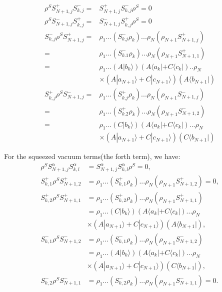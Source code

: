 \documentclass[aps,showpacs,twocolumn,twoside,groupedaddress]{revtex4}
\begin{document}
\begin{equation}
\label{eq8}
\begin{split}
\rho^{S}S_{N+1,j}^{+}S_{k,j}^{-}=&S_{N+1,j}^{+}S_{k,j}^{-}\rho^{S}=0\\
\rho^{S}S_{N+1,j}^{-}S_{k,j}^{+}=&S_{N+1,j}^{-}S_{k,j}^{+}\rho^{S}=0\\
S_{k,j}^{-}\rho^{S}S_{N+1,j}^{+}=&\rho_{1}...(S_{k.j}^{-}\rho_{k})...\rho_{N}(\rho_{N+1}S_{N+1,j}^{+})\\
=&\rho_{1}...(S_{k.1}^{-}\rho_{k})...\rho_{N}(\rho_{N+1}S_{N+1,1}^{+})\\
=&\rho_{1}...(A|b_{k}\rangle)(A\langle a_{k}|+C\langle c_{k}|)..\rho_{N}\\
&\times(A|a_{N+1}\rangle+C|c_{N+1}\rangle)(A\langle b_{N+1}|)\\
S_{k,j}^{+}\rho^{S}S_{N+1,j}^{-}=&\rho_{1}...(S_{k.j}^{+}\rho_{k})...\rho_{N}(\rho_{N+1}S_{N+1,j}^{-})\\
=&\rho_{1}...(S_{k.2}^{+}\rho_{k})...\rho_{N}(\rho_{N+1}S_{N+1,2}^{-})\\
=&\rho_{1}...(C|b_{k}\rangle)(A\langle a_{k}|+C\langle c_{k}|)...\rho_{N}\\
&\times (A|a_{N+1}\rangle+C|c_{N+1}\rangle)(C\langle b_{N+1}|)
\end{split}
\end{equation}

For the squeezed vacuum terms(the forth term), we have:
\begin{equation}
\label{eq9}
\begin{split}
\rho^{S}S_{N+1,j}^{\alpha}S_{k,l}^{\alpha}&=S_{N+1,j}^{\alpha}S_{k,l}^{\alpha}\rho^{S}=0,\\
S_{k,1}^{+}\rho^{S}S_{N+1,2}^{+}&=\rho_{1}...(S_{k,1}^{+}\rho_{k})...\rho_{N}(\rho_{N+1}S_{N+1,2}^{+})=0,\\
S_{k,2}^{+}\rho^{S}S_{N+1,1}^{+}&=\rho_{1}...(S_{k,2}^{+}\rho_{k})...\rho_{N}(\rho_{N+1}S_{N+1,1}^{+})\\
&=\rho_{1}...(C|b_{k}\rangle)(A\langle a_{k}|+C\langle c_{k}|)...\rho_{N}\\
&\times(A|a_{N+1}\rangle+C|c_{N+1}\rangle)(A\langle b_{N+1}|),\\
S_{k,1}^{-}\rho^{S}S_{N+1,2}^{-}&=\rho_{1}...(S_{k,1}^{-}\rho_{k})...\rho_{N}(\rho_{N+1}S_{N+1,2}^{-})\\
&=\rho_{1}...(A|b_{k}\rangle)(A\langle a_{k}|+C\langle c_{k}|)...\rho_{N}\\
&\times(A|a_{N+1}\rangle+C|c_{N+1}\rangle)(C\langle b_{N+1}|),\\
S_{k,2}^{-}\rho^{S}S_{N+1,1}^{-}&=\rho_{1}...(S_{k,2}^{-}\rho_{k})...\rho_{N}(\rho_{N+1}S_{N+1,1}^{-})=0.\\
\end{split}
\end{equation}
\end{document}
